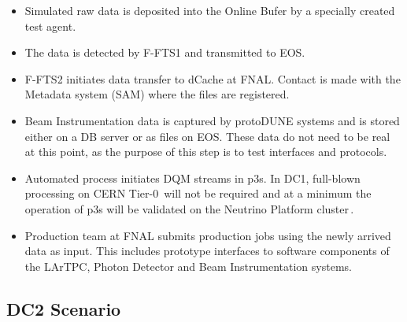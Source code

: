 \documentclass[pdftex,12pt,letter]{article}
\newcommand{\pd}{protoDUNE\xspace}
\begin{document}
\begin{itemize}

\item Simulated raw data is deposited into the Online Bufer by a specially created test agent.

\item The data is detected by F-FTS1 and transmitted to EOS.

\item F-FTS2 initiates data transfer to dCache at FNAL. Contact is made with the Metadata system (SAM) where the files
are registered.

\item Beam Instrumentation data is captured by \pd systems and is stored either on a DB server or as files on EOS.
These data do not need to be real at this point, as the purpose of this step is to test interfaces and protocols.

\item Automated process initiates DQM streams in p3s. In DC1, full-blown processing on CERN Tier-0\,\cite{lxbatch}
will not be required and at a minimum the operation of p3s will be validated on the Neutrino Platform cluster\,\cite{neut}.

\item Production team at FNAL submits production jobs using the newly arrived data as input. This includes prototype interfaces
to software components of the LArTPC, Photon Detector and Beam Instrumentation systems.

\end{itemize}


\subsection{DC2 Scenario}
\end{document}
